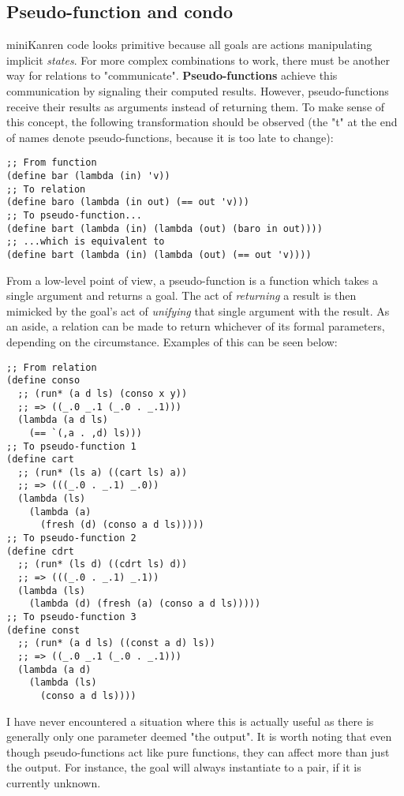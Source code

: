 \subsection{Pseudo-function and condo}
miniKanren code looks primitive because all goals are actions manipulating implicit \textit{states}. For more complex combinations to work, there must be another way for relations to "communicate". \textbf{Pseudo-functions} achieve this communication by signaling their computed results. However, pseudo-functions receive their results as arguments instead of returning them. To make sense of this concept, the following transformation should be observed (the "t" at the end of names denote pseudo-functions, because it is too late to change):
\begin{lstlisting}
;; From function
(define bar (lambda (in) 'v))
;; To relation
(define baro (lambda (in out) (== out 'v)))
;; To pseudo-function...
(define bart (lambda (in) (lambda (out) (baro in out))))
;; ...which is equivalent to
(define bart (lambda (in) (lambda (out) (== out 'v))))
\end{lstlisting}

From a low-level point of view, a pseudo-function is a function which takes a single argument and returns a goal. The act of \textit{returning} a result is then mimicked by the goal's act of \textit{unifying} that single argument with the result. As an aside, a relation can be made to return whichever of its formal parameters, depending on the circumstance. Examples of this can be seen below:
\begin{lstlisting}
;; From relation
(define conso
  ;; (run* (a d ls) (conso x y))
  ;; => ((_.0 _.1 (_.0 . _.1)))
  (lambda (a d ls)
    (== `(,a . ,d) ls)))
;; To pseudo-function 1
(define cart
  ;; (run* (ls a) ((cart ls) a))
  ;; => (((_.0 . _.1) _.0))
  (lambda (ls)
    (lambda (a)
      (fresh (d) (conso a d ls)))))
;; To pseudo-function 2
(define cdrt
  ;; (run* (ls d) ((cdrt ls) d))
  ;; => (((_.0 . _.1) _.1))
  (lambda (ls)
    (lambda (d) (fresh (a) (conso a d ls)))))
;; To pseudo-function 3
(define const
  ;; (run* (a d ls) ((const a d) ls))
  ;; => ((_.0 _.1 (_.0 . _.1)))
  (lambda (a d)
    (lambda (ls)
      (conso a d ls))))
\end{lstlisting}
I have never encountered a situation where this is actually useful as there is generally only one parameter deemed "the output". It is worth noting that even though pseudo-functions act like pure functions, they can affect more than just the output. For instance, the goal  will always instantiate  to a pair, if it is currently unknown.

